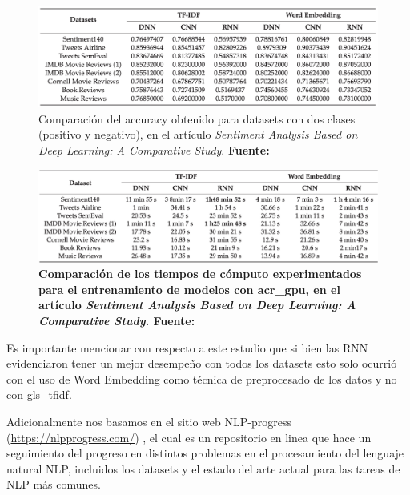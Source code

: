 \begin{figure}[ht!]
    \centering
    \includegraphics[scale=0.45]{figuras/as-eda-accuracy-comparison.png}
    \caption[Análisis de Sentimiento - Tabla - Accuracy]{Comparación del accuracy obtenido para datasets con dos clases (positivo y negativo), en el artículo \textit{Sentiment Analysis Based on Deep Learning: A Comparative Study}. \textbf{Fuente: \cite{Dang_2020}}}
    \label{fig-as-eda-accuracy-comparison}
\end{figure}

\begin{figure}[ht!]
    \centering
    \includegraphics[scale=0.45]{figuras/as-eda-cpu-comparison.png}
    \caption[Análisis de Sentimiento - Tabla - Performance]{\textbf{Comparación de los tiempos de cómputo experimentados para el entrenamiento de modelos con \acrshort{acr_gpu}, en el artículo \textit{Sentiment Analysis Based on Deep Learning: A Comparative Study}. Fuente: \cite{Dang_2020}}}
    \label{fig-as-eda-cpu-comparison}
\end{figure}

Es importante mencionar con respecto a este estudio que si bien las RNN evidenciaron tener un mejor desempeño con todos los datasets esto solo ocurrió con el uso de Word Embedding como técnica de preprocesado de los datos y no con \gls{gls_tfidf}.

Adicionalmente nos basamos en el sitio web NLP-progress (\url{https://nlpprogress.com/}) \cite{Ruder_NLP-progress_2022}, el cual es un repositorio en linea que hace un seguimiento del progreso en distintos problemas en el procesamiento del lenguaje natural NLP, incluidos los datasets y el estado del arte actual para las tareas de NLP más comunes.

